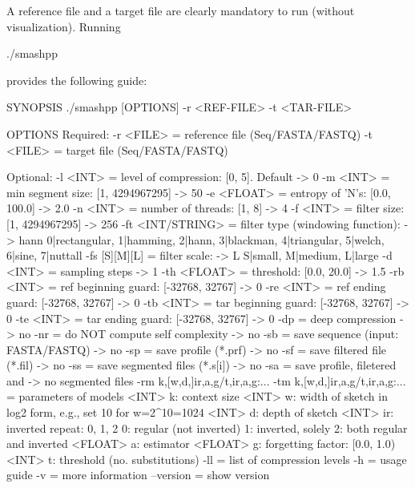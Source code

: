 A reference file and a target file are clearly mandatory to run \smashpp (without visualization). Running
\begin{code}[style=bash]
./smashpp
\end{code}
provides the following guide:
\begin{code}[style=bash]
SYNOPSIS
  ./smashpp [OPTIONS]  -r <REF-FILE>  -t <TAR-FILE>

OPTIONS
  Required:
  -r  <FILE>         = reference file (Seq/FASTA/FASTQ)
  -t  <FILE>         = target file    (Seq/FASTA/FASTQ)

  Optional:
  -l  <INT>          = level of compression: [0, 5]. Default -> 0
  -m  <INT>          = min segment size: [1, 4294967295]     -> 50
  -e  <FLOAT>        = entropy of 'N's: [0.0, 100.0]         -> 2.0
  -n  <INT>          = number of threads: [1, 8]             -> 4
  -f  <INT>          = filter size: [1, 4294967295]          -> 256
  -ft <INT/STRING>   = filter type (windowing function):     -> hann
                       {0|rectangular, 1|hamming, 2|hann,
                       3|blackman, 4|triangular, 5|welch,
                       6|sine, 7|nuttall}
  -fs [S][M][L]      = filter scale:                         -> L
                       {S|small, M|medium, L|large}
  -d  <INT>          = sampling steps                        -> 1
  -th <FLOAT>        = threshold: [0.0, 20.0]                -> 1.5
  -rb <INT>          = ref beginning guard: [-32768, 32767]  -> 0
  -re <INT>          = ref ending guard: [-32768, 32767]     -> 0
  -tb <INT>          = tar beginning guard: [-32768, 32767]  -> 0
  -te <INT>          = tar ending guard: [-32768, 32767]     -> 0
  -dp                = deep compression                      -> no
  -nr                = do NOT compute self complexity        -> no
  -sb                = save sequence (input: FASTA/FASTQ)    -> no
  -sp                = save profile (*.prf)                  -> no
  -sf                = save filtered file (*.fil)            -> no
  -ss                = save segmented files (*.s[i])         -> no
  -sa                = save profile, filetered and           -> no
                       segmented files
  -rm k,[w,d,]ir,a,g/t,ir,a,g:...
  -tm k,[w,d,]ir,a,g/t,ir,a,g:...
                     = parameters of models
                <INT>  k:  context size
                <INT>  w:  width of sketch in log2 form,
                           e.g., set 10 for w=2^10=1024
                <INT>  d:  depth of sketch
                <INT>  ir: inverted repeat: {0, 1, 2}
                           0: regular (not inverted)
                           1: inverted, solely
                           2: both regular and inverted
              <FLOAT>  a:  estimator
              <FLOAT>  g:  forgetting factor: [0.0, 1.0)
                <INT>  t:  threshold (no. substitutions)
  -ll                = list of compression levels
  -h                 = usage guide
  -v                 = more information
  --version          = show version
\end{code}

